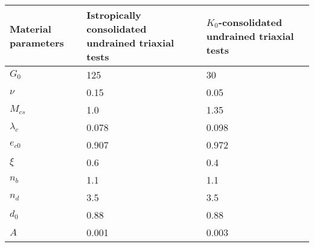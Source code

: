 \begin{table}[htbp]
    \centering
    \label{table:1}
    \begin{tabularx}{\textwidth}{lll}
        \toprule
        Material parameters & Istropically consolidated undrained triaxial tests & $K_0$-consolidated undrained triaxial tests \\
        \midrule
        $G_0$ & 125 & 30 \\
        $\nu$ & 0.15 & 0.05 \\
        $M_{cs}$ & 1.0 & 1.35\\
        $\lambda_c$ & 0.078 & 0.098 \\
        $e_{c0}$ & 0.907 & 0.972 \\
        $\xi$ & 0.6 & 0.4 \\
        $n_b$ & 1.1 & 1.1 \\
        $n_d$ & 3.5 & 3.5 \\
        $d_0$ & 0.88 & 0.88 \\
        $A$ & 0.001 & 0.003 \\
        \bottomrule
    \end{tabularx}
\end{table}
